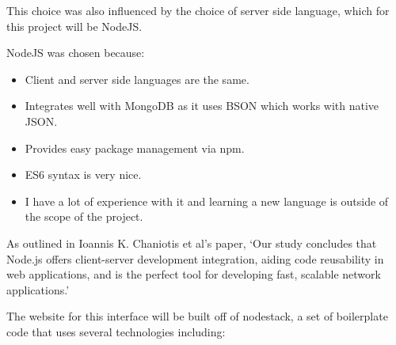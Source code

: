This choice was also influenced by the choice of server side language, which for this project will be NodeJS. 

NodeJS was chosen because:

\begin{itemize}
  \item Client and server side languages are the same.
  \item Integrates well with MongoDB as it uses BSON which works with native JSON.
  \item Provides easy package management via npm.
  \item ES6 syntax is very nice.
  \item I have a lot of experience with it and learning a new language is outside of the scope of the project.
\end{itemize}

As outlined in Ioannis K. Chaniotis et al's paper, `Our study concludes that Node.js offers client-server development integration, aiding code reusability in web applications, and is the perfect tool for developing fast, scalable network applications.'\cite{node-perf}

The website for this interface will be built off of nodestack\cite{nodestack}, a set of boilerplate code that uses several technologies including:


